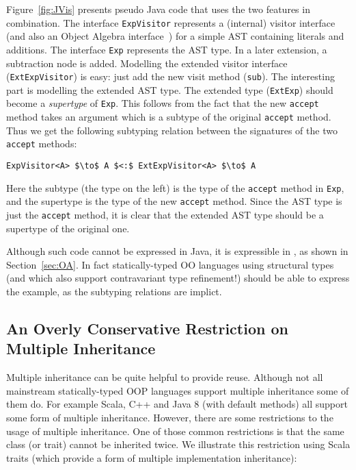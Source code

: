 Figure~\ref{fig:JVis} presents pseudo Java code that uses the two features in
combination. The interface \lstinline{ExpVisitor} represents a (internal)
visitor interface (and also an Object Algebra
interface~\cite{oliveira2012extensibility}) for a simple AST containing literals
and additions. The interface \lstinline{Exp} represents the AST type. In a
later extension, a subtraction node is added. Modelling the extended visitor
interface (\lstinline{ExtExpVisitor}) is easy: just add the new visit method
(\lstinline{sub}). The interesting part is modelling the extended AST type. The
extended type (\lstinline{ExtExp}) should become a \emph{supertype} of
\lstinline{Exp}. This follows from the fact that the new \lstinline{accept}
method takes an argument which is a subtype of the original \lstinline{accept}
method. Thus we get the following subtyping relation between the signatures of
the two \lstinline{accept} methods:

\begin{lstlisting}[mathescape=true]
ExpVisitor<A> $\to$ A $<:$ ExtExpVisitor<A> $\to$ A
\end{lstlisting}

\noindent Here the subtype (the type on the left) is the type of the
\lstinline{accept} method in \lstinline{Exp}, and the supertype is the type of
the new \lstinline{accept} method. Since the AST type is just the
\lstinline{accept} method, it is clear that the extended AST type should be a
supertype of the original one. 

Although such code cannot be expressed in Java, it is expressible in
\name, as shown in Section~\ref{sec:OA}. In fact statically-typed
OO languages using structural types (and which also support
contravariant type refinement!) should be able to express 
the example, as the subtyping relations are implict. 

\subsection{An Overly Conservative Restriction on Multiple Inheritance}

Multiple inheritance can be quite helpful to provide reuse. Although not all
mainstream statically-typed OOP languages support multiple inheritance some of
them do. For example Scala, C++ and Java 8 (with default methods) all support
some form of multiple inheritance. However, there are some restrictions to the
usage of multiple inheritance. One of those common restrictions is that the same
class (or trait) cannot be inherited twice. We illustrate this restriction using
Scala traits (which provide a form of multiple implementation inheritance):

